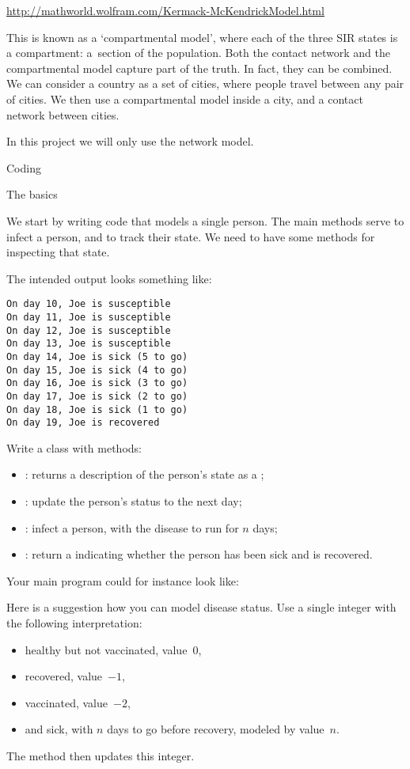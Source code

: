 \url{http://mathworld.wolfram.com/Kermack-McKendrickModel.html}

This is known as a `compartmental model', where each of the three SIR
states is a compartment: a~section of the population.
Both the contact network and
the compartmental model capture part of the truth. In fact, they can
be combined. We can consider a country as a set of cities, where
people travel between any pair of cities. We then use a compartmental
model inside a city, and a contact network between cities.

In this project we will only use the network model.

 {Coding}

 {The basics}

We start by writing code that models a single person. The main methods
serve to infect a person, and to track their state. We need to have
some methods for inspecting that state. 

The intended output looks something like:
\begin{verbatim}
On day 10, Joe is susceptible
On day 11, Joe is susceptible
On day 12, Joe is susceptible
On day 13, Joe is susceptible
On day 14, Joe is sick (5 to go)
On day 15, Joe is sick (4 to go)
On day 16, Joe is sick (3 to go)
On day 17, Joe is sick (2 to go)
On day 18, Joe is sick (1 to go)
On day 19, Joe is recovered
\end{verbatim}

\begin{exercise}
  \label{ex:infect:person}
  Write a  class with methods:
  \begin{itemize}
  \item {} : returns a description of the
    person's state as a ;
  \item {} : update the person's status to the next day;
  \item {} : infect a person, with the disease to run for
    $n$ days;
  \item {} : return a  indicating whether the
    person has been sick and is recovered.
  \end{itemize}
\end{exercise}

Your main program could for instance look like:

Here is a suggestion how you can model 
disease status. Use a single integer with the following interpretation:
\begin{itemize}
\item healthy but not vaccinated, value~$0$,
\item recovered, value~$-1$,
\item vaccinated, value~$-2$,
\item and sick, with $n$ days to go before recovery,  modeled by value~$n$.
\end{itemize}
The  method then updates this integer.

